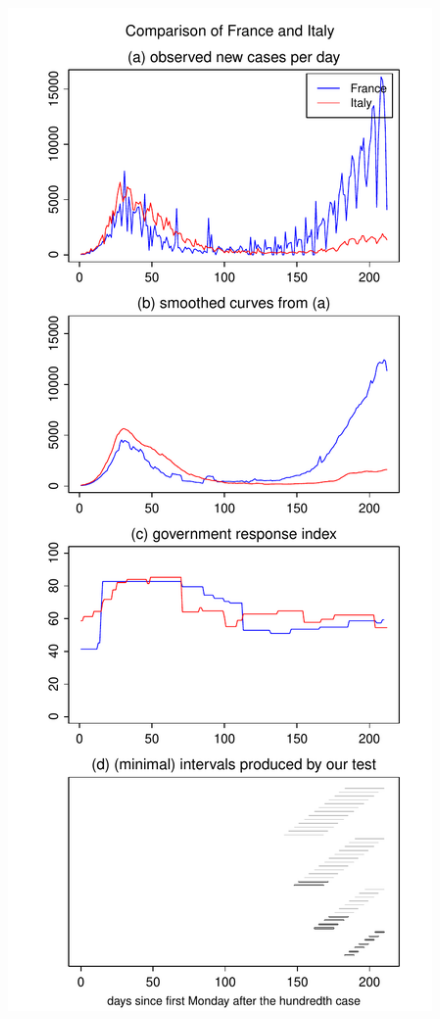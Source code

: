 \documentclass[a4paper,12pt]{article}
\numberwithin{equation}{section}
\begin{document}
\begin{figure}[h!]
\begin{minipage}[t]{0.49\textwidth}
\includegraphics[width=\textwidth]{plots/FRA_vs_ITA_long}

\end{minipage}
\end{figure}
\end{document}
